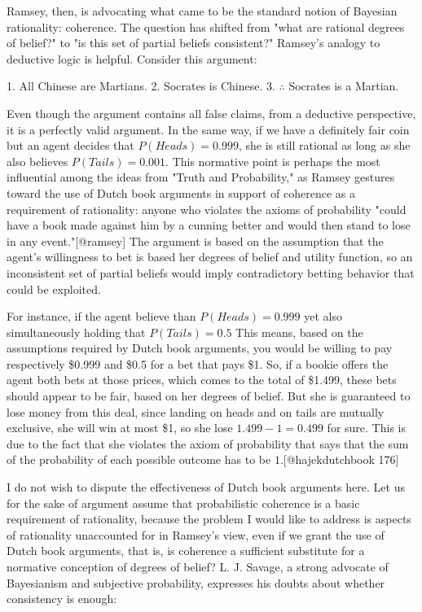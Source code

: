 Ramsey, then, is advocating what came to be the standard notion of
Bayesian rationality: coherence. The question has shifted from "what are
rational degrees of belief?" to "is this set of partial beliefs
consistent?" Ramsey's analogy to deductive logic is helpful. Consider
this argument:

1. All Chinese are Martians. 2. Socrates is Chinese. 3. \(\therefore\)
Socrates is a Martian.

Even though the argument contains all false claims, from a deductive
perspective, it is a perfectly valid argument. In the same way, if we
have a definitely fair coin but an agent decides that
\(P(Heads)=0.999\), she is still rational as long as she also believes
\(P(Tails) = 0.001\). This normative point is perhaps the most
influential among the ideas from "Truth and Probability," as Ramsey
gestures toward the use of Dutch book arguments in support of coherence
as a requirement of rationality: anyone who violates the axioms of
probability "could have a book made against him by a cunning better and
would then stand to lose in any event."{[}@ramsey{]} The argument is
based on the assumption that the agent's willingness to bet is based her
degrees of belief and utility function, so an inconsistent set of
partial beliefs would imply contradictory betting behavior that could be
exploited.

For instance, if the agent believe than \(P(Heads) = 0.999\) yet also
simultaneously holding that \(P(Tails) = 0.5\) This means, based on the
assumptions required by Dutch book arguments, you would be willing to
pay respectively \$0.999 and \$0.5 for a bet that pays \$1. So, if a
bookie offers the agent both bets at those prices, which comes to the
total of \$1.499, these bets should appear to be fair, based on her
degrees of belief. But she is guaranteed to lose money from this deal,
since landing on heads and on tails are mutually exclusive, she will win
at most \$1, so she lose \(1.499 - 1 = 0.499\) for sure. This is due to
the fact that she violates the axiom of probability that says that the
sum of the probability of each possible outcome has to be
\(1\).{[}@hajekdutchbook 176{]}

I do not wish to dispute the effectiveness of Dutch book arguments here.
Let us for the sake of argument assume that probabilistic coherence is a
basic requirement of rationality, because the problem I would like to
address is aspects of rationality unaccounted for in Ramsey's view, even
if we grant the use of Dutch book arguments, that is, is coherence a
sufficient substitute for a normative conception of degrees of belief?
L. J. Savage, a strong advocate of Bayesianism and subjective
probability, expresses his doubts about whether consistency is enough:

